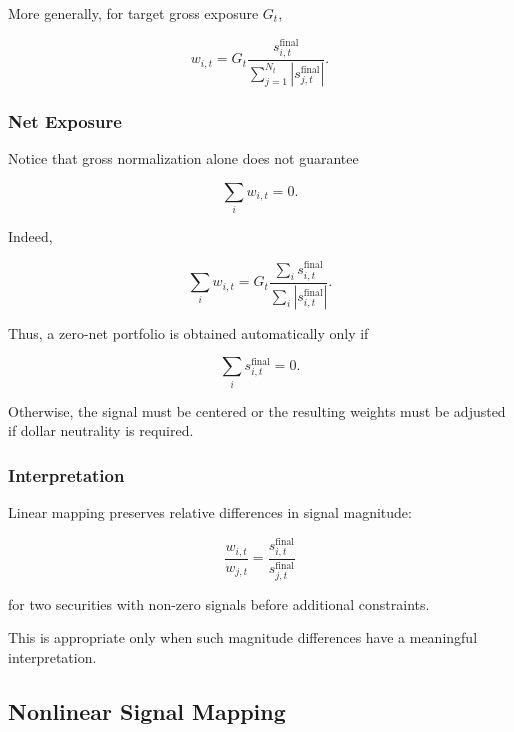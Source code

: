 \documentclass[11pt,a4paper]{article}
\begin{document}
More generally, for target gross exposure $G_t$,

\begin{equation}
\boxed{
w_{i,t}
=
G_t
\frac{
s_{i,t}^{\mathrm{final}}
}{
\sum_{j=1}^{N_t}
|s_{j,t}^{\mathrm{final}}|
}.
}
\end{equation}


\subsubsection{Net Exposure}

Notice that gross normalization alone does not guarantee

\begin{equation}
\sum_i w_{i,t}=0.
\end{equation}

Indeed,

\begin{equation}
\sum_i w_{i,t}
=
G_t
\frac{
\sum_i s_{i,t}^{\mathrm{final}}
}{
\sum_i |s_{i,t}^{\mathrm{final}}|
}.
\end{equation}

Thus, a zero-net portfolio is obtained automatically only if

\begin{equation}
\boxed{
\sum_i s_{i,t}^{\mathrm{final}}=0.
}
\end{equation}

Otherwise, the signal must be centered or the resulting weights must be
adjusted if dollar neutrality is required.


\subsubsection{Interpretation}

Linear mapping preserves relative differences in signal magnitude:

\begin{equation}
\frac{
w_{i,t}
}{
w_{j,t}
}
=
\frac{
s_{i,t}^{\mathrm{final}}
}{
s_{j,t}^{\mathrm{final}}
}
\end{equation}

for two securities with non-zero signals before additional constraints.

This is appropriate only when such magnitude differences have a meaningful
interpretation.


\subsection{Nonlinear Signal Mapping}
\label{subsec:nonlinear_signal_mapping}
\end{document}
